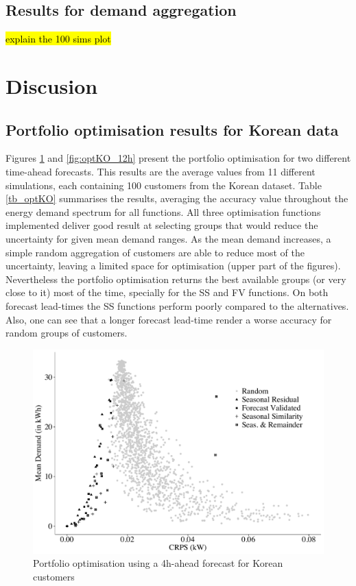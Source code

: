 \documentclass[preprint,3p,12pt,authoryear]{elsarticle}
\begin{document}
\subsection{Results for demand aggregation}
\label{ss:res_demaggr}
\hl{explain the 100 sims plot}


\section{Discusion}
\label{sec:discussion}

\subsection{Portfolio optimisation results for Korean data}
\label{ss:portoptKO}
Figures \ref{fig:optKO_04h} and \ref{fig:optKO_12h} present the portfolio optimisation for two different time-ahead forecasts. This results are the average values from 11 different simulations, each containing 100 customers from the Korean dataset.
Table \ref{tb_optKO} summarises the results, averaging the accuracy value throughout the energy demand spectrum for all functions.
All three optimisation functions implemented deliver good result at selecting groups that would reduce the uncertainty for given mean demand ranges.
As the mean demand increases, a simple random aggregation of customers are able to reduce most of the uncertainty, leaving a limited space for optimisation (upper part of the figures).
Nevertheless the portfolio optimisation returns the best available groups (or very close to it) most of the time, specially for the SS and FV functions.
On both forecast lead-times the SS functions perform poorly compared to the alternatives.
Also, one can see that a longer forecast lead-time render a worse accuracy for random groups of customers.

\begin{figure}
  \centering
  \includegraphics[width=0.8\columnwidth]{2017-11-27_runf_KO_04h.pdf}
  \caption{Portfolio optimisation using a 4h-ahead forecast for Korean customers}
  \label{fig:optKO_04h}
\end{figure}
\end{document}
